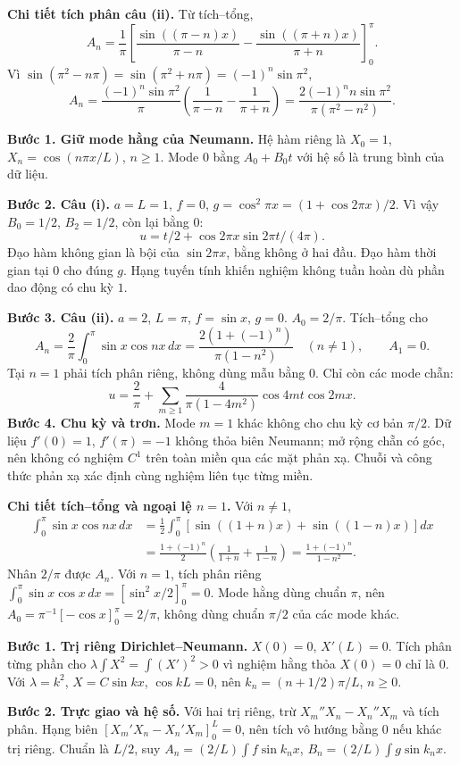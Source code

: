 \textbf{Chi tiết tích phân câu (ii).} Từ tích–tổng,
\[A_n=\frac1\pi\left[\frac{\sin((\pi-n)x)}{\pi-n}-\frac{\sin((\pi+n)x)}{\pi+n}\right]_0^\pi.\]
Vì $\sin(\pi^2-n\pi)=\sin(\pi^2+n\pi)=(-1)^n\sin\pi^2$,
\[A_n=\frac{(-1)^n\sin\pi^2}{\pi}\left(\frac1{\pi-n}-\frac1{\pi+n}\right)
=\frac{2(-1)^nn\sin\pi^2}{\pi(\pi^2-n^2)}.\]

\textbf{Bước 1. Giữ mode hằng của Neumann.} Hệ hàm riêng là $X_0=1$, $X_n=\cos(n\pi x/L)$, $n\ge1$. Mode $0$ bằng $A_0+B_0t$ với hệ số là trung bình của dữ liệu.

\textbf{Bước 2. Câu (i).} $a=L=1$, $f=0$, $g=\cos^2\pi x=(1+\cos2\pi x)/2$. Vì vậy $B_0=1/2$, $B_2=1/2$, còn lại bằng $0$:
\[u=t/2+\cos2\pi x\sin2\pi t/(4\pi).\]
Đạo hàm không gian là bội của $\sin2\pi x$, bằng không ở hai đầu. Đạo hàm thời gian tại $0$ cho đúng $g$. Hạng tuyến tính khiến nghiệm không tuần hoàn dù phần dao động có chu kỳ $1$.

\textbf{Bước 3. Câu (ii).} $a=2$, $L=\pi$, $f=\sin x$, $g=0$. $A_0=2/\pi$. Tích–tổng cho
\[A_n=\frac2\pi\int_0^\pi\sin x\cos nx\,dx
=\frac{2(1+(-1)^n)}{\pi(1-n^2)}\quad(n\ne1),\qquad A_1=0.\]
Tại $n=1$ phải tích phân riêng, không dùng mẫu bằng $0$. Chỉ còn các mode chẵn:
\[u=\frac2\pi+\sum_{m\ge1}\frac4{\pi(1-4m^2)}\cos4mt\cos2mx.\]
\textbf{Bước 4. Chu kỳ và trơn.} Mode $m=1$ khác không cho chu kỳ cơ bản $\pi/2$. Dữ liệu $f'(0)=1$, $f'(\pi)=-1$ không thỏa biên Neumann; mở rộng chẵn có góc, nên không có nghiệm $C^1$ trên toàn miền qua các mặt phản xạ. Chuỗi và công thức phản xạ xác định cùng nghiệm liên tục từng miền.

\textbf{Chi tiết tích–tổng và ngoại lệ $n=1$.} Với $n\ne1$,
\[\begin{aligned}
\int_0^\pi\sin x\cos nx\,dx
&=\frac12\int_0^\pi[\sin((1+n)x)+\sin((1-n)x)]dx\\
&=\frac{1+(-1)^n}{2}\left(\frac1{1+n}+\frac1{1-n}\right)
=\frac{1+(-1)^n}{1-n^2}.
\end{aligned}\]
Nhân $2/\pi$ được $A_n$. Với $n=1$, tích phân riêng $\int_0^\pi\sin x\cos x\,dx=[\sin^2x/2]_0^\pi=0$. Mode hằng dùng chuẩn $\pi$, nên $A_0=\pi^{-1}[-\cos x]_0^\pi=2/\pi$, không dùng chuẩn $\pi/2$ của các mode khác.

\textbf{Bước 1. Trị riêng Dirichlet–Neumann.} $X(0)=0$, $X'(L)=0$. Tích phân từng phần cho $\lambda\int X^2=\int(X')^2>0$ vì nghiệm hằng thỏa $X(0)=0$ chỉ là $0$. Với $\lambda=k^2$, $X=C\sin kx$, $\cos kL=0$, nên $k_n=(n+1/2)\pi/L$, $n\ge0$.

\textbf{Bước 2. Trực giao và hệ số.} Với hai trị riêng, trừ $X_m''X_n-X_n''X_m$ và tích phân. Hạng biên $[X_m'X_n-X_n'X_m]_0^L=0$, nên tích vô hướng bằng $0$ nếu khác trị riêng. Chuẩn là $L/2$, suy $A_n=(2/L)\int f\sin k_nx$, $B_n=(2/L)\int g\sin k_nx$.

